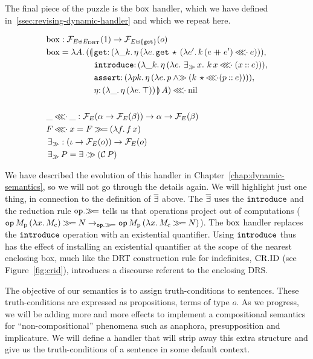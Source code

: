 The final piece of the puzzle is the $\mathrm{box}$ handler, which we have defined
in~\ref{ssec:revising-dynamic-handler} and which we repeat here.

\begin{align*}
  &\BOX :\FF_{E \uplus E_\DRT}(1) \to \FF_{E \uplus \{\op{get}\}}(o) \\
  &\BOX = \lam{A}{(\ap{\begin{aligned}[t]\lban
  &\onto{\op{get}}{(\lam{\_ k}{\etaE{(\lam{e}{\app{\op{get}}{\star}{(\lam{e'}{\ap{k}{(e \cat e')} \apll e})}})}})}, \\
  &\onto{\op{introduce}}{(\lam{\_ k}{\etaE{(\lam{e}{\existsr x.\ \ap{k}{x} \apll (x \cons e)})}})}, \\
  &\onto{\op{assert}}{(\lam{p k}{\etaE{(\lam{e}{p \andr (\ap{k}{\star} \apll (p \cons e))})}})}, \\
  &\onto{\eta}{(\lam{\_}{\etaE{(\lam{e}{\top})}})}\rban}{A}) \apll \nil
    \end{aligned}} \\
  \\
  &\_ \apll \_ : \FF_E(\alpha \to \FF_E(\beta)) \to \alpha \to \FF_E(\beta) \\
  &F \apll x = F \hsbind (\lam{f}{\ap{f}{x}}) \\
  &\existsr : (\iota \to \FF_E(o)) \to  \FF_E(o) \\
  &\existsr P = \exists \apr (\ap{\CC}{P})
\end{align*}

We have described the evolution of this handler in
Chapter~\ref{chap:dynamic-semantics}, so we will not go through the details
again. We will highlight just one thing, in connection to the definition of
$\mathop{\overline{\exists}}$ above. The $\mathop{\overline{\exists}}$ uses the $\mathtt{introduce}$ and the
reduction rule $\mathtt{op}.\mathbin{\gg\!=}$ tells us that operations project out of
computations
($\mathtt{op}\,M_{\mathrm{p}}\,(\lambda x.\, M_{\mathrm{c}}) \mathbin{\gg\!=} N
\to_{\mathtt{op}.\mathbin{\gg\!=}} \mathtt{op}\,M_{\mathrm{p}}\,(\lambda x.\, M_{\mathrm{c}} \mathbin{\gg\!=}
    N)$). The $\mathrm{box}$ handler replaces the $\mathtt{introduce}$ operation with
an existential quantifier. Using $\mathtt{introduce}$ thus has the effect of
installing an existential quantifier at the scope of the nearest enclosing
box, much like the DRT construction rule for indefinites, $\mathrm{CR.ID}$ (see
Figure~\ref{fig:crid}), introduces a discourse referent to the enclosing
DRS.

The objective of our semantics is to assign truth-conditions to
sentences. These truth-conditions are expressed as propositions, terms of
type $o$. As we progress, we will be adding more and more effects to
implement a compositional semantics for ``non-compositional'' phenomena
such as anaphora, presupposition and implicature. We will define a handler
that will strip away this extra structure and give us the truth-conditions
of a sentence in some default context.


